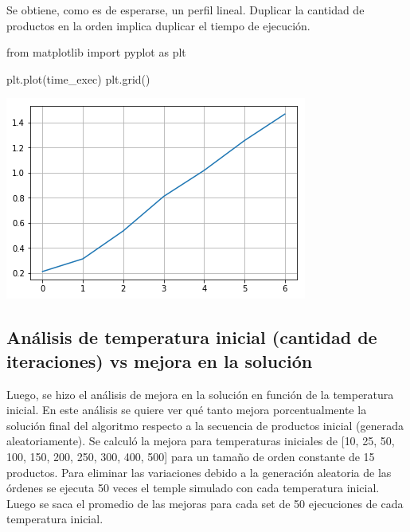 \documentclass[
]{article}
\newenvironment{Shaded}{}{}
\newcommand{\ImportTok}[1]{#1}
\newcommand{\NormalTok}[1]{#1}
\begin{document}
Se obtiene, como es de esperarse, un perfil lineal. Duplicar la cantidad
de productos en la orden implica duplicar el tiempo de ejecución.

\begin{Shaded}
\begin{Highlighting}[]
\ImportTok{from}\NormalTok{ matplotlib }\ImportTok{import}\NormalTok{ pyplot }\ImportTok{as}\NormalTok{ plt}
\end{Highlighting}
\end{Shaded}

\begin{Shaded}
\begin{Highlighting}[]
\NormalTok{plt.plot(time_exec)}
\NormalTok{plt.grid()}
\end{Highlighting}
\end{Shaded}

\includegraphics{output_18_0.png}

\hypertarget{anuxe1lisis-de-temperatura-inicial-cantidad-de-iteraciones-vs-mejora-en-la-soluciuxf3n}{%
\subsection{Análisis de temperatura inicial (cantidad de iteraciones) vs
mejora en la
solución}\label{anuxe1lisis-de-temperatura-inicial-cantidad-de-iteraciones-vs-mejora-en-la-soluciuxf3n}}

Luego, se hizo el análisis de mejora en la solución en función de la
temperatura inicial. En este análisis se quiere ver qué tanto mejora
porcentualmente la solución final del algoritmo respecto a la secuencia
de productos inicial (generada aleatoriamente). Se calculó la mejora
para temperaturas iniciales de {[}10, 25, 50, 100, 150, 200, 250, 300,
400, 500{]} para un tamaño de orden constante de 15 productos. Para
eliminar las variaciones debido a la generación aleatoria de las órdenes
se ejecuta 50 veces el temple simulado con cada temperatura inicial.
Luego se saca el promedio de las mejoras para cada set de 50 ejecuciones
de cada temperatura inicial.
\end{document}
